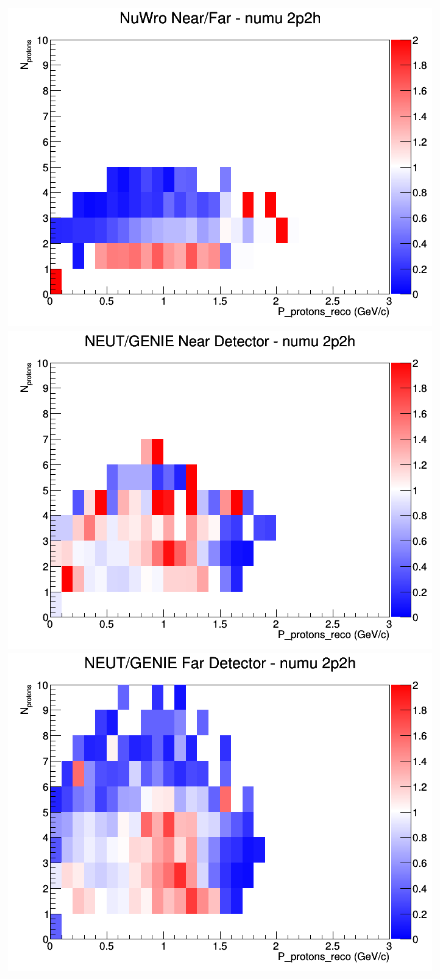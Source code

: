 \begin{figure}[h]
\endminipage
{}
\includegraphics[width=\linewidth]{eff_N_P/FGT/protons/ratios/2p2h_NuWro_numu_NF_N_P.png}
\endminipage
\newline
{}
\includegraphics[width=\linewidth]{eff_N_P/FGT/protons/ratios/2p2h_NEUT_GENIE_numu_near_N_P.png}
\endminipage
{}
\includegraphics[width=\linewidth]{eff_N_P/FGT/protons/ratios/2p2h_NEUT_GENIE_numu_far_N_P.png}

\end{figure}
